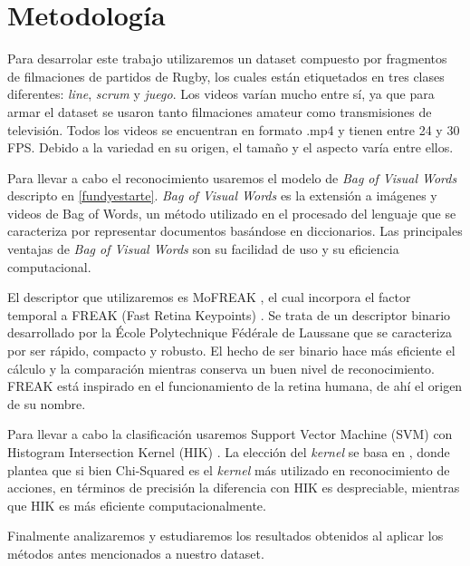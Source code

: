 \section{Metodología}
\iffalse
Se recomienda estructurar esta sección en función de los objetivos específicos.
* Planteo de la hipotesis a analizar en cada objetivo o seccion del proyecto.
* Actividades propuestas y metodologıa a usar en cada una de ellas.
* Resultados que se esperan obtener o metas a cumplir y como se evaluaran
los resultados.
Trate de evaluar los potenciales problemas y limitaciones de la metodolog ́ıa
y t ́ecnicas propuestas y en lo posible proponer alternativas.
\fi

Para desarrolar este trabajo utilizaremos un dataset compuesto por fragmentos de filmaciones de partidos de Rugby, los cuales están etiquetados en
tres clases diferentes: \textit{line}, \textit{scrum} y \textit{juego}. Los videos varían mucho entre sí, ya que para armar el dataset se usaron
tanto filmaciones amateur como transmisiones de televisión. Todos los videos se encuentran en formato .mp4 y tienen entre 24 y 30 FPS. Debido a la
variedad en su origen, el tamaño y el aspecto varía entre ellos.

Para llevar a cabo el reconocimiento usaremos el modelo de \textit{Bag of Visual Words} descripto en \ref{fundyestarte}. \textit{Bag of Visual Words}
es la extensión a imágenes y videos de Bag of Words, un método utilizado en el procesado del lenguaje que se caracteriza por representar documentos
basándose en diccionarios. Las principales ventajas de \textit{Bag of Visual Words} son su facilidad de uso y su eficiencia computacional.

El descriptor que utilizaremos es MoFREAK \parencite{whiten2013mofreak}, el cual incorpora el factor temporal a FREAK (Fast Retina Keypoints) \parencite{alahi2012freak}.
Se trata de un descriptor binario desarrollado por la École Polytechnique Fédérale de Laussane que se caracteriza por ser rápido, compacto y robusto.
El hecho de ser binario hace más eficiente el cálculo y la comparación mientras conserva un buen nivel de reconocimiento. FREAK está inspirado
en el funcionamiento de la retina humana, de ahí el origen de su nombre.

Para llevar a cabo la clasificación usaremos Support Vector Machine (SVM) con Histogram Intersection Kernel (HIK) \parencite{barla2003histogram}. La
elección del \textit{kernel} se basa en \parencite{whiten2013mofreak}, donde plantea que si bien Chi-Squared es el \textit{kernel} más utilizado en
reconocimiento de acciones, en términos de precisión la diferencia con HIK es despreciable, mientras que HIK es más eficiente computacionalmente.

Finalmente analizaremos y estudiaremos los resultados obtenidos al aplicar los métodos antes mencionados a nuestro dataset.
